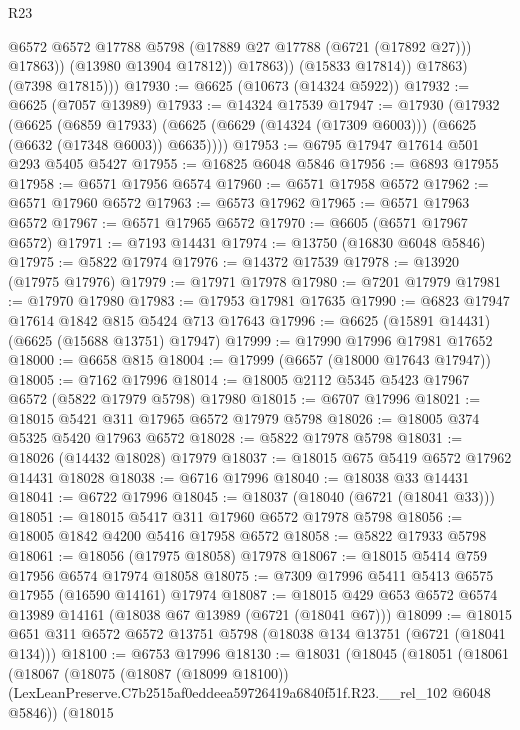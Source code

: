 \begin{lexlean}{R23}
\begin{coremodule}
                      @6572
                      @6572
                      @17788
                      @5798
                      (@17889 @27 @17788 (@6721 (@17892 @27)))
                      @17863))
                  (@13980 @13904 @17812))
                @17863))
            (@15833 @17814))
          @17863)
        (@7398 @17815)))
@17930 := @6625 (@10673 (@14324 @5922))
@17932 := @6625 (@7057 @13989)
@17933 := @14324 @17539
@17947 := @17930
    (@17932
      (@6625
        (@6859 @17933)
        (@6625 (@6629 (@14324 (@17309 @6003))) (@6625 (@6632 (@17348 @6003)) @6635))))
@17953 := @6795 @17947 @17614 @501 @293 @5405 @5427
@17955 := @16825 @6048 @5846
@17956 := @6893 @17955
@17958 := @6571 @17956 @6574
@17960 := @6571 @17958 @6572
@17962 := @6571 @17960 @6572
@17963 := @6573 @17962
@17965 := @6571 @17963 @6572
@17967 := @6571 @17965 @6572
@17970 := @6605 (@6571 @17967 @6572)
@17971 := @7193 @14431
@17974 := @13750 (@16830 @6048 @5846)
@17975 := @5822 @17974
@17976 := @14372 @17539
@17978 := @13920 (@17975 @17976)
@17979 := @17971 @17978
@17980 := @7201 @17979
@17981 := @17970 @17980
@17983 := @17953 @17981 @17635
@17990 := @6823 @17947 @17614 @1842 @815 @5424 @713 @17643
@17996 := @6625 (@15891 @14431) (@6625 (@15688 @13751) @17947)
@17999 := @17990 @17996 @17981 @17652
@18000 := @6658 @815
@18004 := @17999 (@6657 (@18000 @17643 @17947))
@18005 := @7162 @17996
@18014 := @18005 @2112 @5345 @5423 @17967 @6572 (@5822 @17979 @5798) @17980
@18015 := @6707 @17996
@18021 := @18015 @5421 @311 @17965 @6572 @17979 @5798
@18026 := @18005 @374 @5325 @5420 @17963 @6572
@18028 := @5822 @17978 @5798
@18031 := @18026 (@14432 @18028) @17979
@18037 := @18015 @675 @5419 @6572 @17962 @14431 @18028
@18038 := @6716 @17996
@18040 := @18038 @33 @14431
@18041 := @6722 @17996
@18045 := @18037 (@18040 (@6721 (@18041 @33)))
@18051 := @18015 @5417 @311 @17960 @6572 @17978 @5798
@18056 := @18005 @1842 @4200 @5416 @17958 @6572
@18058 := @5822 @17933 @5798
@18061 := @18056 (@17975 @18058) @17978
@18067 := @18015 @5414 @759 @17956 @6574 @17974 @18058
@18075 := @7309 @17996 @5411 @5413 @6575 @17955 (@16590 @14161) @17974
@18087 := @18015 @429 @653 @6572 @6574 @13989 @14161 (@18038 @67 @13989 (@6721 (@18041 @67)))
@18099 := @18015 @651 @311 @6572 @6572 @13751 @5798 (@18038 @134 @13751 (@6721 (@18041 @134)))
@18100 := @6753 @17996
@18130 := @18031
    (@18045
      (@18051
        (@18061
          (@18067
            (@18075
              (@18087 (@18099 @18100))
              (LexLeanPreserve.C7b2515af0eddeea59726419a6840f51f.R23.__rel_102 @6048 @5846))
            (@18015

\end{coremodule}
\end{lexlean}
